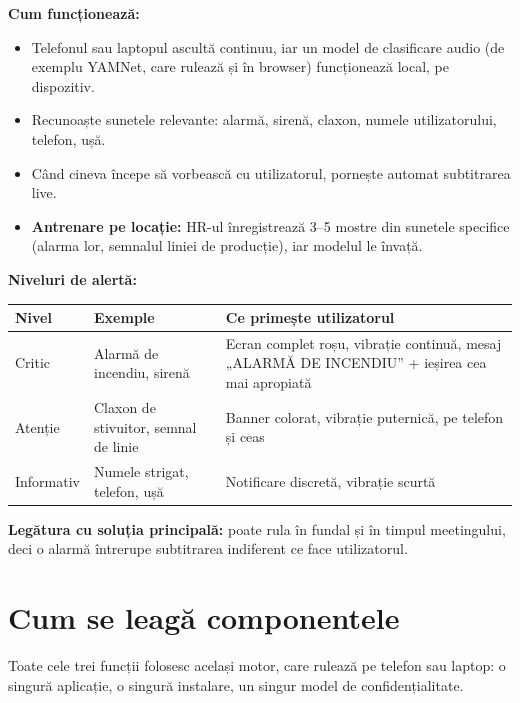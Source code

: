 \documentclass[11pt,a4paper]{article}
\begin{document}
\textbf{Cum funcționează:}
\begin{itemize}
  \item Telefonul sau laptopul ascultă continuu, iar un model de clasificare audio (de exemplu YAMNet, care rulează și în browser) funcționează local, pe dispozitiv.
  \item Recunoaște sunetele relevante: alarmă, sirenă, claxon, numele utilizatorului, telefon, ușă.
  \item Când cineva începe să vorbească cu utilizatorul, pornește automat subtitrarea live.
  \item \textbf{Antrenare pe locație:} HR-ul înregistrează 3--5 mostre din sunetele specifice (alarma lor, semnalul liniei de producție), iar modelul le învață.
\end{itemize}

\textbf{Niveluri de alertă:}
\begin{center}
\begin{tabularx}{\textwidth}{>{\raggedright\arraybackslash}p{2.2cm} >{\raggedright\arraybackslash}p{4.3cm} L}
\toprule
\textbf{Nivel} & \textbf{Exemple} & \textbf{Ce primește utilizatorul} \\
\midrule
Critic & Alarmă de incendiu, sirenă & Ecran complet roșu, vibrație continuă, mesaj „ALARMĂ DE INCENDIU” + ieșirea cea mai apropiată \\
Atenție & Claxon de stivuitor, semnal de linie & Banner colorat, vibrație puternică, pe telefon și ceas \\
Informativ & Numele strigat, telefon, ușă & Notificare discretă, vibrație scurtă \\
\bottomrule
\end{tabularx}
\end{center}

\textbf{Legătura cu soluția principală:} poate rula în fundal și în timpul meetingului, deci o alarmă întrerupe subtitrarea indiferent ce face utilizatorul.

\section*{Cum se leagă componentele}

Toate cele trei funcții folosesc același motor, care rulează pe telefon sau laptop: o singură aplicație, o singură instalare, un singur model de confidențialitate.
\end{document}

